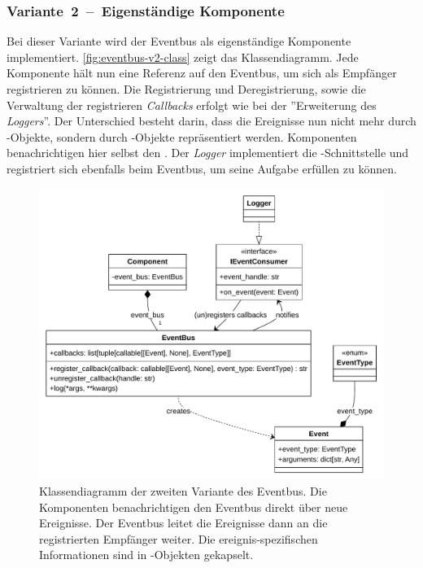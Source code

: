 \subsubsection*{Variante~2~--~Eigenständige Komponente}

Bei dieser Variante wird der Eventbus als eigenständige Komponente implementiert. \autoref{fig:eventbus-v2-class} zeigt das Klassendiagramm. Jede Komponente hält nun eine Referenz auf den Eventbus, um sich als Empfänger registrieren zu können. Die Registrierung und Deregistrierung, sowie die Verwaltung der registrieren \emph{Callbacks} erfolgt wie bei der ''Erweiterung des \emph{Loggers}''. Der Unterschied besteht darin, dass die Ereignisse nun nicht mehr durch -Objekte, sondern durch -Objekte repräsentiert werden. Komponenten benachrichtigen hier selbst den . Der \emph{Logger} implementiert die -Schnittstelle und registriert sich ebenfalls beim Eventbus, um seine Aufgabe erfüllen zu können.

\begin{figure}[!ht]
	\centering
	\includegraphics[width=1.0\linewidth]{images/diagrams/eventbus-v2-class.pdf}
	\caption{Klassendiagramm der zweiten Variante des Eventbus. Die Komponenten benachrichtigen den Eventbus direkt über neue Ereignisse. Der Eventbus leitet die Ereignisse dann an die registrierten Empfänger weiter. Die ereignis-spezifischen Informationen sind in -Objekten gekapselt.}
	\label{fig:eventbus-v2-class}
\end{figure}

